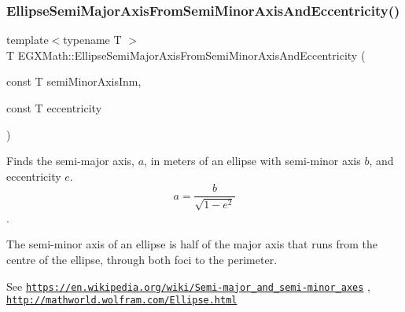\mbox{\label{group___e_g_x_math-_geometry-2_d-_ellipse-_semi_major_axis_ga505f404b0c1f4f73853c97e0a9ee2ef1}} 
\subsubsection{\texorpdfstring{Ellipse\+Semi\+Major\+Axis\+From\+Semi\+Minor\+Axis\+And\+Eccentricity()}{EllipseSemiMajorAxisFromSemiMinorAxisAndEccentricity()}}
{\footnotesize\ttfamily template$<$typename T $>$ \\
T E\+G\+X\+Math\+::\+Ellipse\+Semi\+Major\+Axis\+From\+Semi\+Minor\+Axis\+And\+Eccentricity (\begin{DoxyParamCaption}\item[{const T}]{semi\+Minor\+Axis\+Inm,  }\item[{const T}]{eccentricity }\end{DoxyParamCaption})}



Finds the semi-\/major axis, $a$, in meters of an ellipse with semi-\/minor axis $b$, and eccentricity $e$. \[ a=\frac{b}{\sqrt{1-e^2}} \]. 

The semi-\/minor axis of an ellipse is half of the major axis that runs from the centre of the ellipse, through both foci to the perimeter.

See \href{https://en.wikipedia.org/wiki/Semi-major_and_semi-minor_axes}{\tt https\+://en.\+wikipedia.\+org/wiki/\+Semi-\/major\+\_\+and\+\_\+semi-\/minor\+\_\+axes} , \href{http://mathworld.wolfram.com/Ellipse.html}{\tt http\+://mathworld.\+wolfram.\+com/\+Ellipse.\+html}


